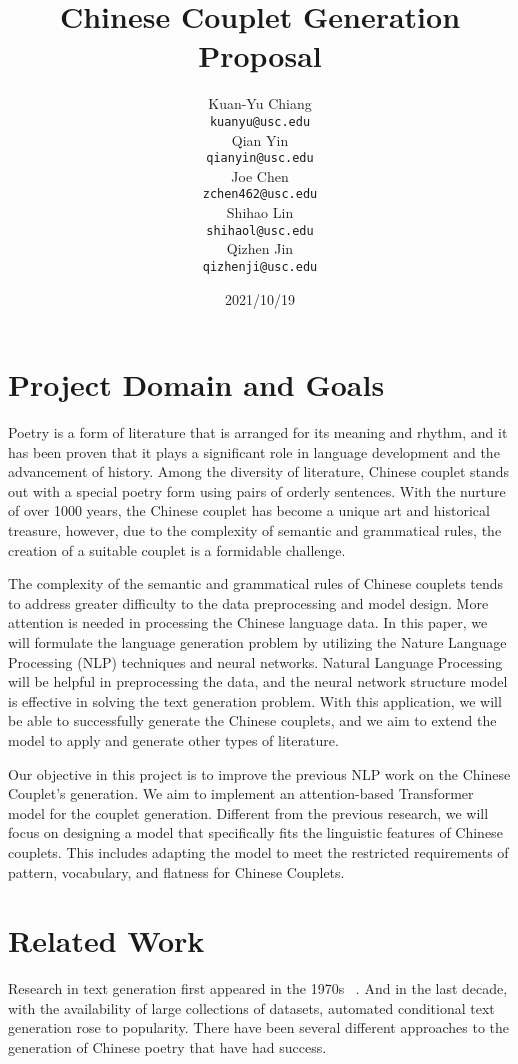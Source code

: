 \documentclass[11pt]{article}
\title{Chinese Couplet Generation Proposal}
\author{
  Kuan-Yu Chiang\\
  \texttt{kuanyu@usc.edu}
  \\\And
  Qian Yin\\
  \texttt{qianyin@usc.edu}
  \\\And
  Joe Chen\\
  \texttt{zchen462@usc.edu}
  \\\AND
  Shihao Lin\\
  \texttt{shihaol@usc.edu}
  \\\And
  Qizhen Jin\\
  \texttt{qizhenji@usc.edu}
}
\date{2021/10/19}
\begin{document}
\maketitle

\section{Project Domain and Goals}

Poetry is a form of literature that is arranged for its meaning and rhythm, and it has been proven that it plays a significant role in language development and the advancement of history. Among the diversity of literature, Chinese couplet stands out with a special poetry form using pairs of orderly sentences. With the nurture of over 1000 years, the Chinese couplet has become a unique art and historical treasure, however, due to the complexity of semantic and grammatical rules, the creation of a suitable couplet is a formidable challenge.

The complexity of the semantic and grammatical rules of Chinese couplets tends to address greater difficulty to the data preprocessing and model design. More attention is needed in processing the Chinese language data. In this paper, we will formulate the language generation problem by utilizing the Nature Language Processing (NLP) techniques and neural networks. Natural Language Processing will be helpful in preprocessing the data, and the neural network structure model is effective in solving the text generation problem. With this application, we will be able to successfully generate the Chinese couplets, and we aim to extend the model to apply and generate other types of literature.

Our objective in this project is to improve the previous NLP work on the Chinese Couplet’s generation. We aim to implement an attention-based Transformer model for the couplet generation. Different from the previous research, we will focus on designing a model that specifically fits the linguistic features of Chinese couplets. This includes adapting the model to meet the restricted requirements of pattern, vocabulary, and flatness for Chinese Couplets.


\section{Related Work}

Research in text generation first appeared in the 1970s ~\cite{Goldman:74}. And in the last decade, with the availability of large collections of datasets, automated conditional text generation rose to popularity. There have been several different approaches to the generation of Chinese poetry that have had success. 
\end{document}
